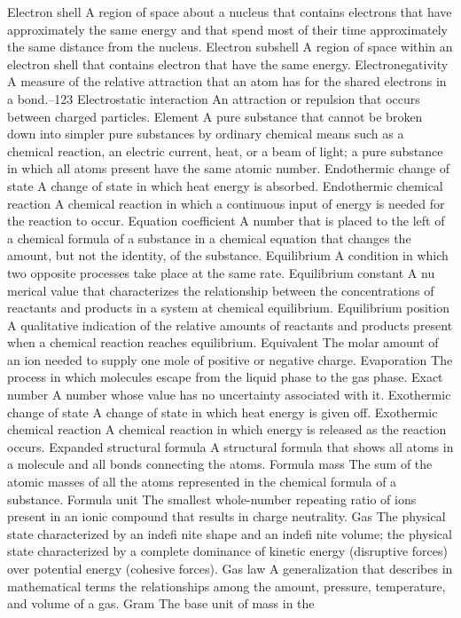\documentclass[10pt, roman]{article}
\begin{document}
Electron shell A region of space about a nucleus that contains electrons that have approximately the same energy and that spend most of their time approximately the same distance from the nucleus. Electron subshell 
A region of space within an electron shell that contains electron that have the same energy. Electronegativity A measure of the relative attraction that an atom has for the shared electrons in a bond.–123 
Electrostatic interaction An attraction or repulsion that occurs between charged particles. Element A pure substance that cannot be broken down into simpler pure substances by ordinary chemical means such as a 
chemical reaction, an electric current, heat, or a beam of light; a pure substance in which all atoms present have the same atomic number. Endothermic change of state A change of state in which heat energy is 
absorbed. Endothermic chemical reaction A chemical reaction in which a continuous input of energy is needed for the reaction to occur. Equation coefficient A number that is placed to the left of a chemical formula 
of a substance in a chemical equation that changes the amount, but not the identity, of the substance. Equilibrium A condition in which two opposite processes take place at the same rate. Equilibrium constant A nu
merical value that characterizes the relationship between the concentrations of reactants and products in a system at chemical equilibrium. Equilibrium position A qualitative indication of the relative amounts 
of reactants and products present when a chemical reaction reaches equilibrium. Equivalent The molar amount of an ion needed to supply one mole of positive or negative charge. Evaporation The process in which 
molecules escape from the liquid phase to the gas phase. Exact number A number whose value has no uncertainty associated with it. Exothermic change of state A change of state in which heat energy is given off. 
Exothermic chemical reaction A chemical reaction in which energy is released as the reaction occurs. Expanded structural formula A structural formula that shows all atoms in a molecule and all bonds connecting the 
atoms. Formula mass The sum of the atomic masses of all the atoms represented in the chemical formula of a substance. Formula unit The smallest whole-number repeating ratio of ions present in an ionic compound that 
results in charge neutrality. Gas The physical state characterized by an indefi nite shape and an indefi nite volume; the physical state characterized by a complete dominance of kinetic energy (disruptive forces) 
over potential energy (cohesive forces). Gas law A generalization that describes in mathematical terms the relationships among the amount, pressure, temperature, and volume of a gas. Gram The base unit of mass in the 
\end{document}
